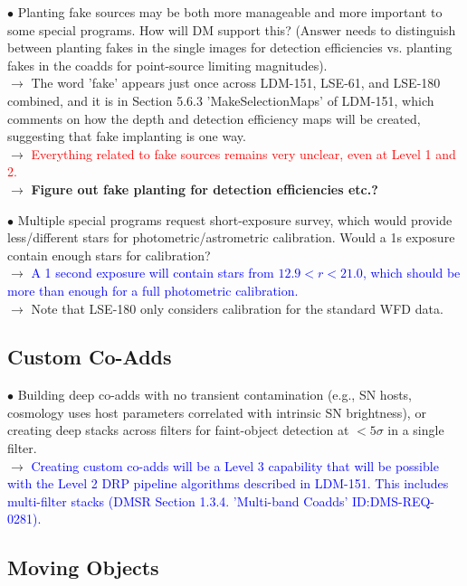 \documentclass[DM,lsstdraft,toc]{lsstdoc}
\begin{document}
$\bullet$ Planting fake sources may be both more manageable and more important to some special programs. How will DM support this? (Answer needs to distinguish between planting fakes in the single images for detection efficiencies vs. planting fakes in the coadds for point-source limiting magnitudes). \\
$\rightarrow$ The word 'fake' appears just once across LDM-151, LSE-61, and LSE-180 combined, and it is in Section 5.6.3 'MakeSelectionMaps' of LDM-151, which comments on how the depth and detection efficiency maps will be created, suggesting that fake implanting is one way. \\
$\rightarrow$ \textcolor{red}{Everything related to fake sources remains very unclear, even at Level 1 and 2.} \\
$\rightarrow$ \textbf{Figure out fake planting for detection efficiencies etc.?}

$\bullet$ Multiple special programs request short-exposure survey, which would provide less/different stars for photometric/astrometric calibration. Would a 1s exposure contain enough stars for calibration? \\
$\rightarrow$ \textcolor{blue}{A 1 second exposure will contain stars from $12.9<r<21.0$, which should be more than enough for a full photometric calibration.} \\
$\rightarrow$ Note that LSE-180 only considers calibration for the standard WFD data.

\subsection{Custom Co-Adds}\label{ssec:issues_coadds}

$\bullet$ Building deep co-adds with no transient contamination (e.g., SN hosts, cosmology uses host parameters correlated with intrinsic SN brightness), or creating deep stacks across filters for faint-object detection at $<5\sigma$ in a single filter. \\
$\rightarrow$ \textcolor{blue}{Creating custom co-adds will be a Level 3 capability that will be possible with the Level 2 DRP pipeline algorithms described in LDM-151. This includes multi-filter stacks (DMSR Section 1.3.4. 'Multi-band Coadds' ID:DMS-REQ-0281).}


\subsection{Moving Objects}\label{ssec:issues_mops}
\end{document}
